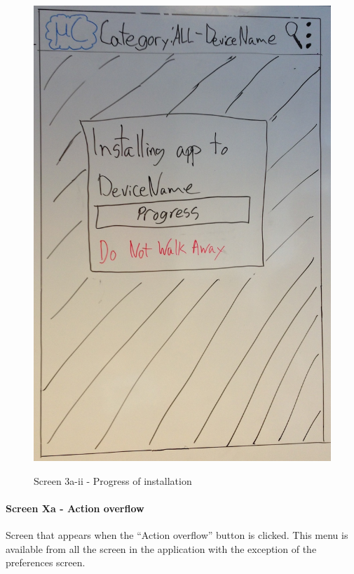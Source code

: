 \begin{figure}[H]
\centering
\includegraphics[scale=0.2]{images/Design_guide/Screen3a-ii.png}
\label{fig:3a-ii}
\caption{Screen 3a-ii - Progress of installation}
\end{figure}


\paragraph{Screen Xa - Action overflow}
Screen that appears when the ``Action overflow'' button is clicked. This menu is available from all the screen in the application with the exception of the preferences screen.

